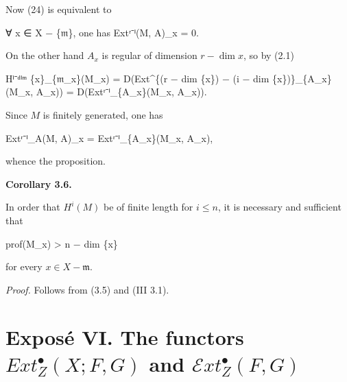 \documentclass[
]{article}
\newenvironment{Shaded}{}{}
\newcommand{\NormalTok}[1]{#1}
\begin{document}
Now (24) is equivalent to

\begin{Shaded}
\begin{Highlighting}[]
\NormalTok{∀ x ∈ X − \{𝔪\}, one has Extʳ⁻ⁱ(M, A)\_x = 0.}
\end{Highlighting}
\end{Shaded}

On the other hand \(A_{x}\) is regular of dimension \(r - \dim {x}\), so
by (2.1)

\begin{Shaded}
\begin{Highlighting}[]
\NormalTok{Hⁱ⁻ᵈⁱᵐ \{x\}\_\{𝔪\_x\}(M\_x) = D(Ext\^{}\{(r − dim \{x\}) − (i − dim \{x\})\}\_\{A\_x\}(M\_x, A\_x)) = D(Extʳ⁻ⁱ\_\{A\_x\}(M\_x, A\_x)).}
\end{Highlighting}
\end{Shaded}

Since \(M\) is finitely generated, one has

\begin{Shaded}
\begin{Highlighting}[]
\NormalTok{Extʳ⁻ⁱ\_A(M, A)\_x = Extʳ⁻ⁱ\_\{A\_x\}(M\_x, A\_x),}
\end{Highlighting}
\end{Shaded}

whence the proposition.

\textbf{Corollary 3.6.}

In order that \(H^{i}(M)\) be of finite length for \(i \leqslant n\), it
is necessary and sufficient that

\begin{Shaded}
\begin{Highlighting}[]
\NormalTok{prof(M\_x) \textgreater{} n − dim \{x\}}
\end{Highlighting}
\end{Shaded}

for every \(x \in X - {\mathfrak{m}}\).

\emph{Proof.} Follows from (3.5) and (III 3.1).

\section{\texorpdfstring{Exposé VI. The functors
\(Ext^{\bullet}_{Z}(X; F, G)\) and
\(\mathcal{E}xt^{\bullet}_{Z}(F, G)\)}{Exposé VI. The functors Ext\^{}\{\textbackslash bullet\}\_\{Z\}(X; F, G) and \textbackslash mathcal\{E\}xt\^{}\{\textbackslash bullet\}\_\{Z\}(F, G)}}\label{exposuxe9-vi.-the-functors-extbullet_zx-f-g-and-mathcalextbullet_zf-g}
\end{document}
